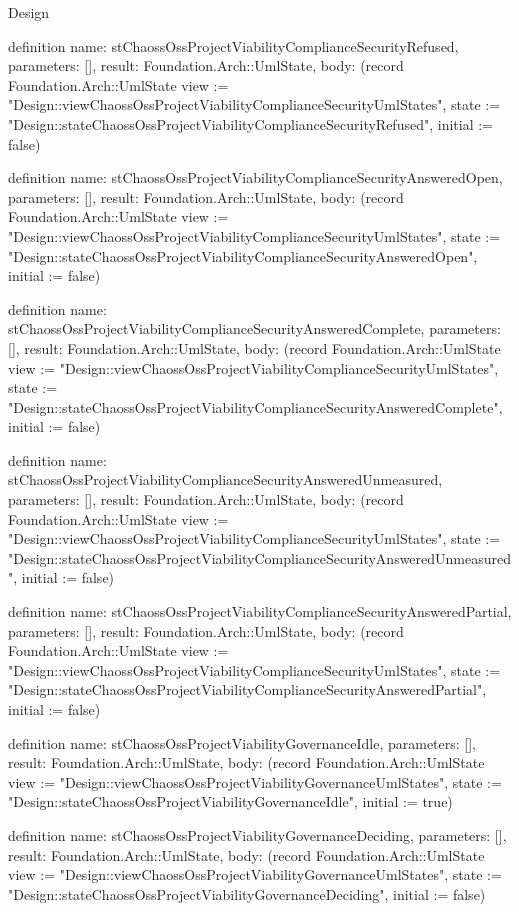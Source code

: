 \begin{lexlean}{Design}
\begin{semanticmodule}
definition{
  name: stChaossOssProjectViabilityComplianceSecurityRefused,
  parameters: [],
  result: Foundation.Arch::UmlState,
  body: (record Foundation.Arch::UmlState {view := "Design::viewChaossOssProjectViabilityComplianceSecurityUmlStates", state := "Design::stateChaossOssProjectViabilityComplianceSecurityRefused", initial := false})
}

definition{
  name: stChaossOssProjectViabilityComplianceSecurityAnsweredOpen,
  parameters: [],
  result: Foundation.Arch::UmlState,
  body: (record Foundation.Arch::UmlState {view := "Design::viewChaossOssProjectViabilityComplianceSecurityUmlStates", state := "Design::stateChaossOssProjectViabilityComplianceSecurityAnsweredOpen", initial := false})
}

definition{
  name: stChaossOssProjectViabilityComplianceSecurityAnsweredComplete,
  parameters: [],
  result: Foundation.Arch::UmlState,
  body: (record Foundation.Arch::UmlState {view := "Design::viewChaossOssProjectViabilityComplianceSecurityUmlStates", state := "Design::stateChaossOssProjectViabilityComplianceSecurityAnsweredComplete", initial := false})
}

definition{
  name: stChaossOssProjectViabilityComplianceSecurityAnsweredUnmeasured,
  parameters: [],
  result: Foundation.Arch::UmlState,
  body: (record Foundation.Arch::UmlState {view := "Design::viewChaossOssProjectViabilityComplianceSecurityUmlStates", state := "Design::stateChaossOssProjectViabilityComplianceSecurityAnsweredUnmeasured", initial := false})
}

definition{
  name: stChaossOssProjectViabilityComplianceSecurityAnsweredPartial,
  parameters: [],
  result: Foundation.Arch::UmlState,
  body: (record Foundation.Arch::UmlState {view := "Design::viewChaossOssProjectViabilityComplianceSecurityUmlStates", state := "Design::stateChaossOssProjectViabilityComplianceSecurityAnsweredPartial", initial := false})
}

definition{
  name: stChaossOssProjectViabilityGovernanceIdle,
  parameters: [],
  result: Foundation.Arch::UmlState,
  body: (record Foundation.Arch::UmlState {view := "Design::viewChaossOssProjectViabilityGovernanceUmlStates", state := "Design::stateChaossOssProjectViabilityGovernanceIdle", initial := true})
}

definition{
  name: stChaossOssProjectViabilityGovernanceDeciding,
  parameters: [],
  result: Foundation.Arch::UmlState,
  body: (record Foundation.Arch::UmlState {view := "Design::viewChaossOssProjectViabilityGovernanceUmlStates", state := "Design::stateChaossOssProjectViabilityGovernanceDeciding", initial := false})
}


\end{semanticmodule}
\end{lexlean}

